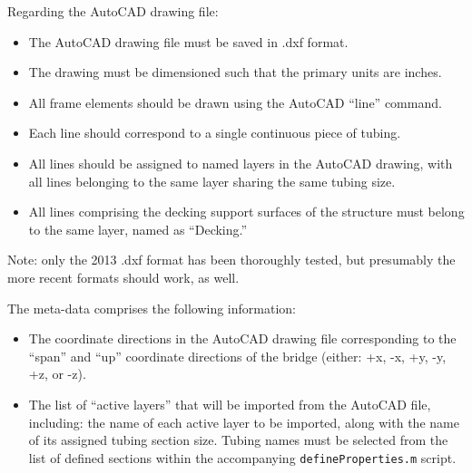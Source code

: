 \documentclass[12pt,a4paper,article]{memoir} %
\begin{document}
Regarding the AutoCAD drawing file:
\begin{itemize}
	\item The AutoCAD drawing file must be saved in .dxf format.
	\item The drawing must be dimensioned such that the primary units are inches.
	\item All frame elements should be drawn using the AutoCAD ``line'' command.
	\item Each line should correspond to a single continuous piece of tubing.
	\item All lines should be assigned to named layers in the AutoCAD drawing, with all lines belonging to the same layer sharing the same tubing size.
	\item All lines comprising the decking support surfaces of the structure must belong to the same layer, named as ``Decking.''
\end{itemize}
Note: only the 2013 .dxf format has been thoroughly tested, but presumably the more recent formats should work, as well.

The meta-data comprises the following information:
\begin{itemize}
	\item The coordinate directions in the AutoCAD drawing file corresponding to the ``span'' and ``up'' coordinate directions of the bridge (either: +x, -x, +y, -y, +z, or -z).
	\item The list of ``active layers'' that will be imported from the AutoCAD file, including: the name of each active layer to be imported, along with the name of its assigned tubing section size. Tubing names must be selected from the list of defined sections within the accompanying \texttt{defineProperties.m} script.
\end{itemize}

\end{document}
